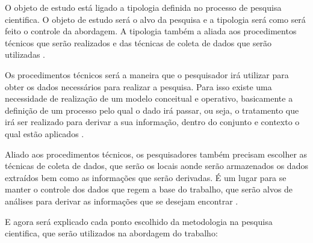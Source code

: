         O objeto de estudo está ligado a tipologia definida no processo de pesquisa cientifica. O objeto de estudo será o alvo da
        pesquisa e a tipologia será como será feito o controle da abordagem. A tipologia também a aliada aos procedimentos
        técnicos que serão realizados e das técnicas de coleta de dados que serão utilizadas \cite{prodanov2013}.

        Os procedimentos técnicos será a maneira que o pesquisador irá utilizar para obter os dados necessários para realizar a
        pesquisa. Para isso existe uma necessidade de realização de um modelo conceitual e operativo, basicamente a definição
        de um processo pelo qual o dado irá passar, ou seja, o tratamento que irá ser realizado para derivar a sua informação,
        dentro do conjunto e contexto o qual estão aplicados \cite{lakatos2010}.

        Aliado aos procedimentos técnicos, os pesquisadores também precisam escolher as técnicas de coleta de dados, que serão
        os locais aonde serão armazenados os dados extraídos bem como as informações que serão derivadas. É um lugar
        para se manter o controle dos dados que regem a base do trabalho, que serão alvos de análises para derivar as informações
        que se desejam encontrar \cite{prodanov2013}.

        E agora será explicado cada ponto escolhido da metodologia na pesquisa cientifica, que serão utilizados na abordagem do trabalho:

